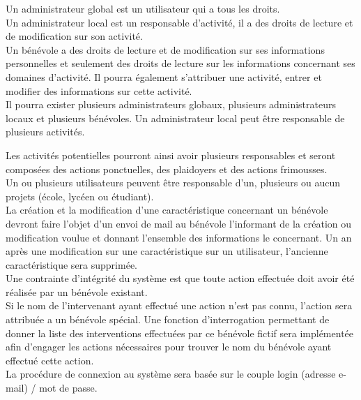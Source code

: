 Un administrateur global est un utilisateur qui a tous les droits. \\ Un administrateur local est un responsable d'activité, il a des droits de lecture et de modification sur son activité. \\ Un bénévole a des droits de lecture et de modification sur ses informations personnelles et seulement des droits de lecture sur les informations concernant ses domaines d'activité. Il pourra également s'attribuer une activité, entrer et modifier des informations sur cette activité.\\
Il pourra exister plusieurs administrateurs globaux, plusieurs administrateurs locaux et plusieurs bénévoles. Un administrateur local peut être responsable de plusieurs activités.



Les activités potentielles pourront ainsi avoir plusieurs responsables et seront composées des actions ponctuelles, des plaidoyers et des actions frimousses. \\

Un ou plusieurs utilisateurs peuvent être responsable d'un, plusieurs ou aucun projets (école, lycéen ou étudiant).\\

La création et la modification d'une caractéristique concernant un bénévole devront faire l'objet d'un envoi de mail au bénévole l'informant de la création ou modification voulue et donnant l'ensemble des informations le concernant. Un an après une modification sur une caractéristique sur un utilisateur, l'ancienne caractéristique sera supprimée. \\


Une contrainte d'intégrité du système est que toute action effectuée doit avoir été réalisée par un bénévole existant. \\
Si le nom de l'intervenant ayant effectué une action n'est pas connu, l'action sera attribuée a un bénévole spécial. Une fonction d'interrogation permettant de donner la liste des interventions effectuées par ce bénévole fictif sera implémentée afin d'engager les actions nécessaires pour trouver le nom du bénévole ayant effectué cette action. \\


La procédure de connexion au système sera basée sur le couple login (adresse e-mail) / mot de passe.
